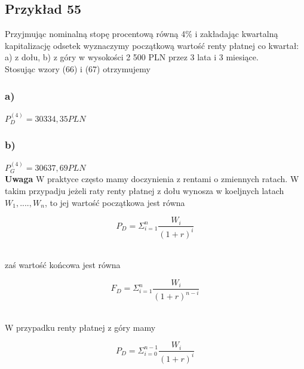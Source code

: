 \documentclass{article}
\begin{document}
\subsection{Przykład 55}

Przyjmując nominalną stopę procentową równą 4\% i zakładając kwartalną kapitalizację odsetek wyznaczymy początkową wartość renty płatnej co kwartał: a) z dołu, b) z góry w wysokości 2 500 PLN przez 3 lata i 3 miesiące.\\

Stosując wzory (66) i (67) otrzymujemy\\

\subsubsection{a)}

$ P^{(4)}_D = 30 334,35 PLN $\\

\subsubsection{b)}

$ P^{(4)}_G = 30 637,69 PLN $\\

\textbf{Uwaga} W praktyce często mamy doczynienia z rentami o zmiennych ratach. W takim przypadju jeżeli raty renty płatnej z dołu wynosza w koeljnych latach $ W_1,...., W_n $, to jej wartość początkowa jest równa

\begin{center}
	\begin{equation}
		P_D = \Sigma ^n_{i=1} \frac{W_i}{(1 + r)^i}
	\end{equation}
\end{center}\\

zaś wartość końcowa jest równa\\

\begin{center}
	\begin{equation}
		F_D = \Sigma ^n_{i=1} \frac{W_i}{(1 + r)^{n-i}}
	\end{equation}
\end{center}\\

W przypadku renty płatnej z góry mamy 

\begin{center}
	\begin{equation}
		P_D = \Sigma ^{n-1}_{i=0} \frac{W_i}{(1 + r)^i}
	\end{equation}
\end{center}\\
\end{document}
